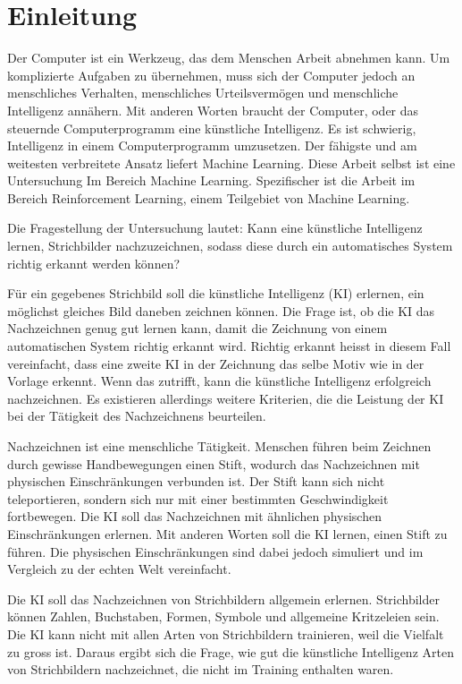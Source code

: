\chapter{Einleitung}\label{chap:einleit}
Der Computer ist ein Werkzeug, das dem Menschen Arbeit abnehmen kann. Um
komplizierte Aufgaben zu übernehmen, muss sich der Computer jedoch an
menschliches Verhalten, menschliches Urteilsvermögen und menschliche Intelligenz
annähern. Mit anderen Worten braucht der Computer, oder das steuernde
Computerprogramm eine künstliche Intelligenz. Es ist schwierig, Intelligenz in
einem Computerprogramm umzusetzen. Der fähigste und am weitesten verbreitete
Ansatz liefert Machine Learning. Diese Arbeit selbst ist eine Untersuchung Im
Bereich Machine Learning. Spezifischer ist die Arbeit im Bereich Reinforcement
Learning, einem Teilgebiet von Machine Learning.

Die Fragestellung der Untersuchung lautet: Kann eine künstliche Intelligenz
lernen, Strichbilder nachzuzeichnen, sodass diese durch ein automatisches System
richtig erkannt werden können?

Für ein gegebenes Strichbild soll die künstliche Intelligenz (KI) erlernen, ein
möglichst gleiches Bild daneben zeichnen können. Die Frage ist, ob die KI das
Nachzeichnen genug gut lernen kann, damit die Zeichnung von einem automatischen
System richtig erkannt wird. Richtig erkannt heisst in diesem Fall vereinfacht,
dass eine zweite KI in der Zeichnung das selbe Motiv wie in der Vorlage erkennt.
Wenn das zutrifft, kann die künstliche Intelligenz erfolgreich nachzeichnen. Es
existieren allerdings weitere Kriterien, die die Leistung der KI bei der
Tätigkeit des Nachzeichnens beurteilen.

Nachzeichnen ist eine menschliche Tätigkeit. Menschen führen beim Zeichnen durch
gewisse Handbewegungen einen Stift, wodurch das Nachzeichnen mit physischen
Einschränkungen verbunden ist. Der Stift kann sich nicht teleportieren, sondern
sich nur mit einer bestimmten Geschwindigkeit fortbewegen. Die KI soll das
Nachzeichnen mit ähnlichen physischen Einschränkungen erlernen. Mit anderen
Worten soll die KI lernen, einen Stift zu führen.  Die
physischen Einschränkungen sind dabei jedoch simuliert und im Vergleich zu der
echten Welt vereinfacht. 

Die KI soll das Nachzeichnen von Strichbildern allgemein erlernen. Strichbilder
können Zahlen, Buchstaben, Formen, Symbole und allgemeine Kritzeleien sein. Die
KI kann nicht mit allen Arten von Strichbildern trainieren, weil die Vielfalt zu
gross ist. Daraus ergibt sich die Frage, wie gut die künstliche Intelligenz
Arten von Strichbildern nachzeichnet, die nicht im Training enthalten waren.

